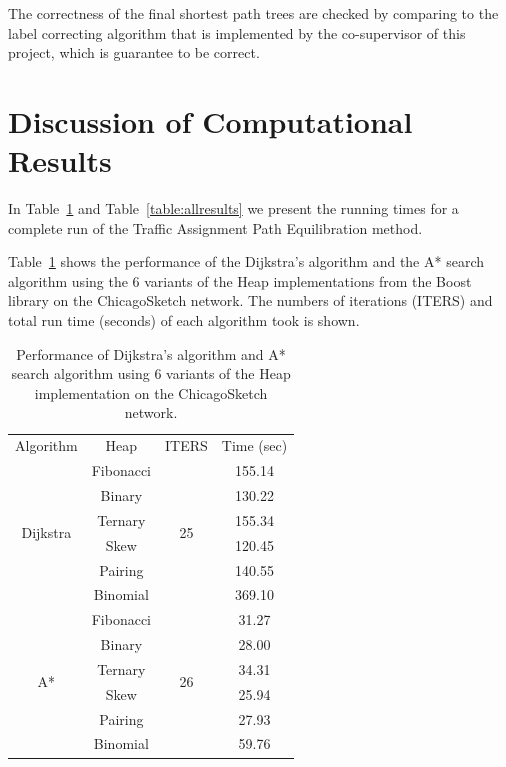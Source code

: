 The correctness of the final shortest path trees are checked by comparing to the label correcting algorithm that is implemented by the co-supervisor of this project, which is guarantee to be correct.

\section{Discussion of Computational Results}
In Table~\ref{table:boostresult} and Table~\ref{table:allresults} we present the running times for a complete run of the Traffic Assignment Path Equilibration method.

Table~\ref{table:boostresult} shows the performance of the Dijkstra's algorithm and the A* search algorithm using the 6 variants of the Heap implementations from the Boost library on the ChicagoSketch network.
The numbers of iterations (ITERS)
and total run time (seconds) of each algorithm took is shown.

\begin{table}[H]
    \centering
    \begin{tabular}{c c c c } \toprule
        Algorithm & Heap & ITERS & Time (sec)\\
        \cmidrule(lr){1-1}
        \cmidrule(lr){2-2}
        \cmidrule(lr){3-3}
        \cmidrule(lr){4-4}
        \multirow{6}{*}{Dijkstra} & Fibonacci & \multirow{6}{*}{25}
             & 155.14 \\
        &    Binary   & & 130.22 \\
        &    Ternary  & & 155.34 \\
        &    Skew     & & 120.45 \\
        &    Pairing  & & 140.55 \\
        &    Binomial & & 369.10 \\
        \cmidrule(lr){1-1}
        \cmidrule(lr){2-2}
        \cmidrule(lr){3-3}
        \cmidrule(lr){4-4}
        \multirow{6}{*}{A*} & Fibonacci & \multirow{6}{*}{26}
                & 31.27 \\
        &    Binary  &&  28.00 \\
        &    Ternary &&  34.31 \\
        &    Skew    &&  25.94 \\
        &    Pairing &&  27.93 \\
        &    Binomial&&  59.76 \\
        \bottomrule
    \end{tabular}
    \caption{Performance of Dijkstra's algorithm and A* search algorithm using 6 variants of the Heap implementation on the ChicagoSketch network. }
    \label{table:boostresult}
\end{table}

